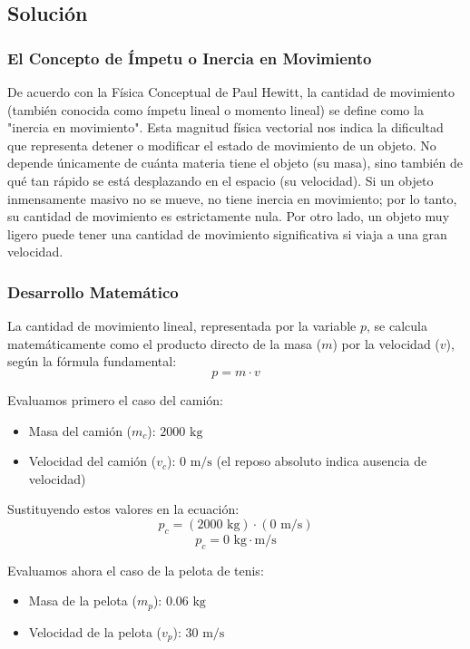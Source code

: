 \documentclass{article}
\begin{document}
\subsection*{Solución}

\subsubsection*{El Concepto de Ímpetu o Inercia en Movimiento}
De acuerdo con la Física Conceptual de Paul Hewitt, la cantidad de movimiento (también conocida como ímpetu lineal o momento lineal) se define como la "inercia en movimiento". Esta magnitud física vectorial nos indica la dificultad que representa detener o modificar el estado de movimiento de un objeto. No depende únicamente de cuánta materia tiene el objeto (su masa), sino también de qué tan rápido se está desplazando en el espacio (su velocidad). Si un objeto inmensamente masivo no se mueve, no tiene inercia en movimiento; por lo tanto, su cantidad de movimiento es estrictamente nula. Por otro lado, un objeto muy ligero puede tener una cantidad de movimiento significativa si viaja a una gran velocidad.

\subsubsection*{Desarrollo Matemático}
La cantidad de movimiento lineal, representada por la variable $p$, se calcula matemáticamente como el producto directo de la masa ($m$) por la velocidad ($v$), según la fórmula fundamental:
$$p = m \cdot v$$

Evaluamos primero el caso del camión:
\begin{itemize}
    \item Masa del camión ($m_c$): $2000 \text{ kg}$
    \item Velocidad del camión ($v_c$): $0 \text{ m/s}$ (el reposo absoluto indica ausencia de velocidad)
\end{itemize}

Sustituyendo estos valores en la ecuación:
$$p_c = (2000 \text{ kg}) \cdot (0 \text{ m/s})$$
$$p_c = 0 \text{ kg}\cdot\text{m/s}$$

Evaluamos ahora el caso de la pelota de tenis:
\begin{itemize}
    \item Masa de la pelota ($m_p$): $0.06 \text{ kg}$
    \item Velocidad de la pelota ($v_p$): $30 \text{ m/s}$
\end{itemize}
\end{document}
